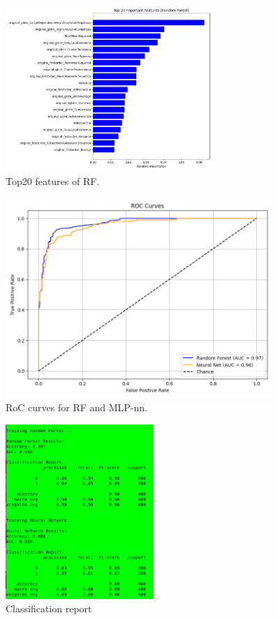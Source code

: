 \documentclass[11pt,a4paper]{article}
\begin{document}
		\begin{figure}[h]
			\centering
			\includegraphics[width=0.7\textwidth]{images/top20_rf_pyradiomics.png}
			\caption{Top20 features of RF.}
			\label{fig1:}
		\end{figure}		

		\begin{figure}[H]
			\centering
			\includegraphics[width=0.9\textwidth]{images/roc_pyradiomics.png}
			\caption{RoC curves for RF and MLP-nn.}
			\label{fig1:}
		\end{figure}		

		\begin{figure}[H]
			\centering
			\includegraphics[width=0.5\textwidth]{images/report_pyradiomics.png}
			\caption{Classification report}
			\label{fig1:}
		\end{figure}		
\end{document}
